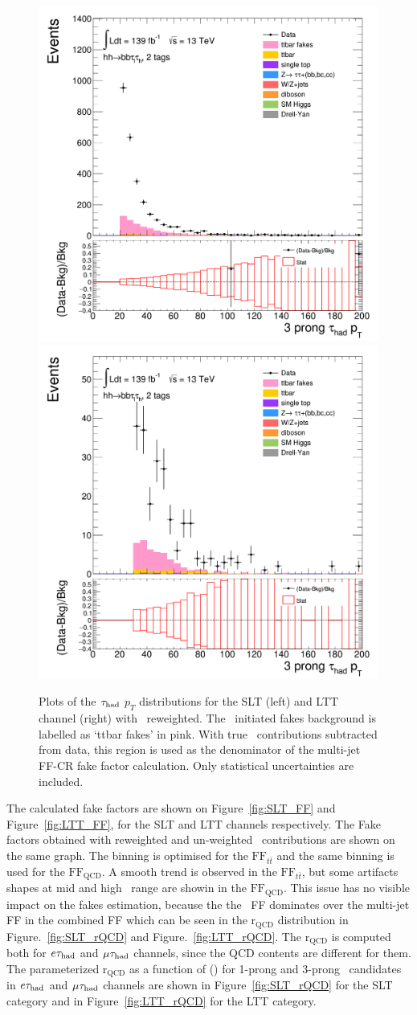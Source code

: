 \begin{figure}[htbp]
\centering
\includegraphics[width=.45\textwidth]{DiHiggs/plots/FF_CRs/InvCR_SLT/HNone/BDTVarsHighMbb/2/C_2tag2pjet_0ptv_TauPt3P.png}
\includegraphics[width=.45\textwidth]{DiHiggs/plots/FF_CRs/InvCR_LTT/HNone/BDTVarsHighMbb/2/C_2tag2pjet_0ptv_TauPt3P.png}\\
\caption{Plots of the $\tau_{\mathrm{had}}$ $p_T$ distributions for the SLT (left) and LTT channel (right) with \ttbar\ reweighted.
The \ttbar\ initiated fakes background is labelled as `ttbar fakes' in pink.
With true \tauhad\ contributions subtracted from data, 
this region is used as the denominator of the multi-jet FF-CR fake factor calculation. 
Only statistical uncertainties are included.}
\label{fig:InvCR_3}
\end{figure} 

The calculated fake factors are shown on Figure~\ref{fig:SLT_FF} and Figure~\ref{fig:LTT_FF}, 
for the SLT and LTT channels respectively. 
The Fake factors obtained with reweighted and un-weighted \ttbar\ contributions are shown on the
same graph. 
The binning is optimised for the $\text{FF}_{t\bar{t}}$ and the same binning is used for the 
$\text{FF}_\text{QCD}$. A smooth trend is observed in the $\text{FF}_{t\bar{t}}$, 
but some artifacts shapes at mid and high \pt\ range are showin in the $\text{FF}_\text{QCD}$.
This issue has no visible impact on the fakes estimation, because the 
the \ttbar\ FF dominates over the multi-jet FF in the combined FF which can be seen 
in the $\mathrm{r}_\text{QCD}$ distribution in Figure.~\ref{fig:SLT_rQCD} and Figure.~\ref{fig:LTT_rQCD}. 
The $\mathrm{r}_{\mathrm{QCD}}$ is computed both for $e\tau_{\mathrm{had}}$ and $\mu\tau_{\mathrm{had}}$ channels, 
since the QCD contents are different for them.
The parameterized $\mathrm{r}_{\mathrm{QCD}}$ 
as a function of \pT(\tauhad) for 1-prong and 3-prong \tauhad\ candidates in $e\tau_{\mathrm{had}}$ and $\mu\tau_{\mathrm{had}}$ channels 
are shown in Figure~\ref{fig:SLT_rQCD} for the SLT category and 
in Figure~\ref{fig:LTT_rQCD} for the LTT category.

